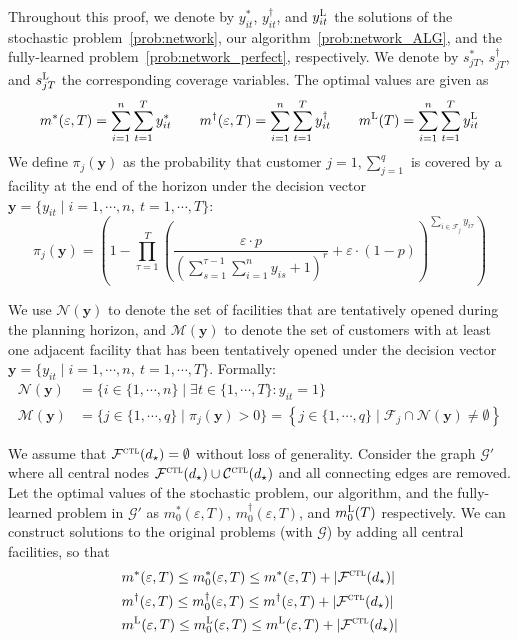 \documentclass[nonblindrev]{informs3noheader}
\def\calC{\mathcal{C}}
\def\calF{\mathcal{F}}
\def\calG{\mathcal{G}}
\def\calM{\mathcal{M}}
\def\calN{\mathcal{N}}
\def\by{\boldsymbol{y}}
\begin{document}
Throughout this proof, we denote by $y^*_{it}$, $y^\dagger_{it}$, and $y^{\textsc{L}}_{it}$ the solutions of the stochastic problem~\eqref{prob:network}, our algorithm~\eqref{prob:network_ALG}, and the fully-learned problem~\eqref{prob:network_perfect}, respectively. We denote by $s^*_{jT}$, $s^\dagger_{jT}$, and $s^{\textsc{L}}_{jT}$ the corresponding coverage variables. The optimal values are given as
\begin{align*}
    m^*(\varepsilon, T)=\sum_{i=1}^n \sum_{t=1}^T y^*_{it}\qquad
    m^\dagger(\varepsilon, T)=\sum_{i=1}^n \sum_{t=1}^T y^\dagger_{it}\qquad
    m^{\textsc{L}}(T)=\sum_{i=1}^n \sum_{t=1}^T y^{\textsc{L}}_{it}
\end{align*}
We define $\pi_{j}(\by)$ as the probability that customer $j=1,\sum_{j=1}^q$ is covered by a facility at the end of the horizon under the decision vector $\by=\{y_{it}\mid i=1,\cdots,n,\ t=1,\cdots,T\}$:
\begin{equation*}
    \pi_{j}(\by)=\left(1-\prod_{\tau=1}^T \left(\frac{\varepsilon\cdot p}{\left(\sum_{s=1}^{\tau-1} \sum_{i=1}^n y_{is} +1\right)^r}+\varepsilon\cdot(1-p)\right)^{\sum_{i \in \calF_j} y_{i\tau}}\right)
\end{equation*}

We use $\calN(\by)$ to denote the set of facilities that are tentatively opened during the planning horizon, and $\calM(\by)$ to denote the set of customers with at least one adjacent facility that has been tentatively opened under the decision vector $\by=\{y_{it}\mid i=1,\cdots,n,\ t=1,\cdots,T\}$. Formally:
\begin{align*}
    \calN(\by)&=\{i\in\{1,\cdots,n\} \mid \exists t\in\{1,\cdots,T\}:y_{it}=1\}\\
    \calM(\by)&=\{j\in\{1,\cdots,q\} \mid \pi_{j}(\by)>0\}=\left\{j\in\{1,\cdots,q\}\mid\calF_j\cap\calN(\by)\neq\emptyset\right\}
\end{align*}

We assume that $\calF^\textsc{ctl}(d_\star)=\emptyset$ without loss of generality. Consider the graph $\calG'$ where all central nodes $\calF^\textsc{ctl}(d_\star)\cup \calC^\textsc{ctl}(d_\star)$ and all connecting edges are removed. Let the optimal values of the stochastic problem, our algorithm, and the fully-learned problem in $\calG'$ as $m_0^*(\varepsilon, T)$, $m_0^\dagger(\varepsilon, T)$, and $m_0^{\textsc{L}}(T)$ respectively. We can construct solutions to the original problems (with $\calG$) by adding all central facilities, so that
\begin{align*}
    & m^*(\varepsilon, T)\leq m_0^*(\varepsilon, T)\leq m^*(\varepsilon, T)+|\calF^\textsc{ctl}(d_\star)|\\
    & m^\dagger(\varepsilon, T)\leq m_0^\dagger(\varepsilon, T)\leq m^\dagger(\varepsilon, T)+|\calF^\textsc{ctl}(d_\star)|\\
    & m^{\textsc{L}}(\varepsilon, T)\leq m_0^{\textsc{L}}(\varepsilon, T)\leq m^{\textsc{L}}(\varepsilon, T)+|\calF^\textsc{ctl}(d_\star)|
\end{align*}
\end{document}
